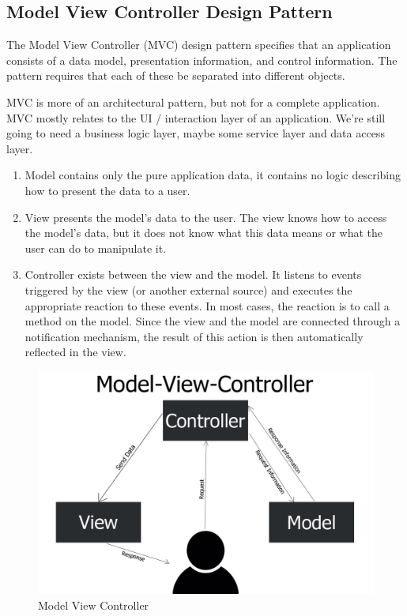 \subsection{Model View Controller Design Pattern}

The Model View Controller (MVC) design pattern specifies that an application consists of a data model, presentation information, and control information. The pattern requires that each of these be separated into different objects.

MVC is more of an architectural pattern, but not for a complete application. MVC mostly relates to the UI / interaction layer of an application. We’re still going to need a business logic layer, maybe some service layer and data access layer.
\begin{enumerate}
      \item Model contains only the pure application data, it contains no logic describing how to present the data to a user.
      \item View presents the model’s data to the user. The view knows how to access the model’s data, but it does not know what this data means or what the user can do to manipulate it.
      \item Controller exists between the view and the model. It listens to events triggered by the view (or another external source) and executes the appropriate reaction to these events. In most cases, the reaction is to call a method on the model. Since the view and the model are connected through a notification mechanism, the result of this action is then automatically reflected in the view.
\end{enumerate}

\begin{figure}[!ht]
      \center
      \includegraphics[scale=0.30]{assets/mvc.jpg}
      \caption{Model View Controller}
      \label{fig:mvc}
\end{figure}
